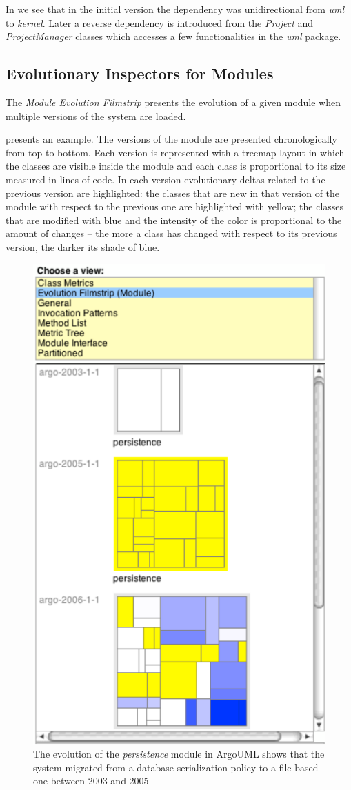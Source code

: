 \documentclass[preprint,12pt]{elsarticle}
\newcommand{\cd}[1]{{\em{#1}}}
\begin{document}
In  we see that in the initial version the dependency was unidirectional from \cd{uml} to \cd{kernel}. Later a reverse dependency is introduced from the \cd{Project} and \cd{ProjectManager} classes which accesses a few functionalities in the \cd{uml} package.

\subsection {Evolutionary Inspectors for Modules}
The {\em Module Evolution Filmstrip} presents the evolution of a given module when multiple versions of the system are loaded. 

 presents an example. The versions of the module are presented chronologically from top to bottom. Each version is represented with a treemap layout in which the classes are visible inside the module and each class is proportional to its size measured in lines of code. In each version evolutionary deltas related to the previous version are highlighted: the classes that are new in that version of the module with respect to the previous one are highlighted with yellow; the classes that are modified with blue and the intensity of the color is proportional to the amount of changes -- the more a class has changed with respect to its previous version, the darker its shade of blue. %

\begin{figure}[h]
\begin{center}
\includegraphics[width=0.45\linewidth]{images/ModuleFilmstrip}
\caption{The evolution of the \cd{persistence} module in ArgoUML shows that the system migrated from a database serialization policy to a file-based one between 2003 and 2005}
\end{center}
\end{figure}
\end{document}
